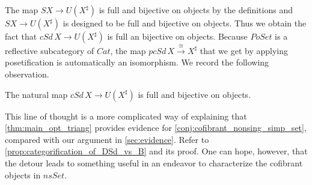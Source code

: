 The map $SX\to U(X^\sharp )$ is full and bijective on objects by the definitions and $SX\to U(X^\sharp )$ is designed to be full and bijective on objects. Thus we obtain the fact that $cSd\, X\to U(X^\sharp )$ is full an bijective on objects. Because $PoSet$ is a reflective subcategory of $Cat$, the map $pcSd\, X\xrightarrow{\cong } X^\sharp$ that we get by applying posetification is automatically an isomorphism. We record the following observation.
\begin{lemma}
\label{lem:comparison_categorification_of_subdivision_vs_non-degenerate_simplices_poset}
The natural map $cSd\, X\to U(X^\sharp )$ is full and bijective on objects.
\end{lemma}

This line of thought is a more complicated way of explaining that \cref{thm:main_opt_triang} provides evidence for \cref{conj:cofibrant_nonsing_simp_set}, compared with our argument in \cref{sec:evidence}. Refer to \cref{prop:categorification_of_DSd_vs_B} and its proof. One can hope, however, that the detour leads to something useful in an endeavor to characterize the cofibrant objects in $nsSet$.

